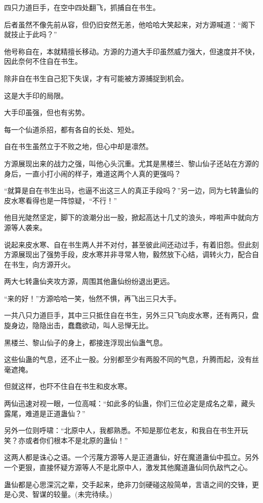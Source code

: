 \begin{this_body}
四只力道巨手，在空中四处翻飞，抓捕自在书生。

后者虽然不像先前从容，但仍旧安然无恙，他哈哈大笑起来，对方源喊道：“阁下就技止于此吗？”

他号称自在，本就精擅长移动。方源的力道大手印虽然威力强大，但速度并不快，因此奈何不住自在书生。

除非自在书生自己犯下失误，才有可能被方源捕捉到机会。

这是大手印的局限。

大手印虽强，但也有劣势。

每一个仙道杀招，都有各自的长处、短处。

自在书生虽然立于不败之地，但心中却是凛然。

方源展现出来的战力之强，叫他心头沉重。尤其是黑楼兰、黎山仙子还站在方源的身后，一直小打小闹的样子，难道这两个人真的更强吗？

“就算是自在书生出马，也逼不出这三人的真正手段吗？”另一边，同为七转蛊仙的皮水寒看得也是一阵惊疑，“不行！”

他目光陡然坚定，脚下的浪潮分出一股，掀起高达十几丈的浪头，哗啦声中就向方源等人袭来。

说起来皮水寒、自在书生两人并不对付，甚至彼此间还动过手，有着旧怨。但此刻方源展现出了强势手段，皮水寒并非寻常人物，毅然放下心结，调转火力，配合自在书生，向方源开火。

两大七转蛊仙夹攻方源，周围其他蛊仙纷纷退出更远。

“来的好！”方源哈哈一笑，怡然不惧，再飞出三只大手。

一共八只力道巨手，其中三只抵住自在书生，另外三只飞向皮水寒，还有两只，盘旋身边，隐隐出击，蠢蠢欲动，叫人忌惮无比。

黑楼兰、黎山仙子的身上，都接连浮现出仙蛊气息。

这些仙蛊的气息，还不止一股。分别都至少有两股不同的气息，升腾而起，没有丝毫遮掩。

但就这样，也吓不住自在书生和皮水寒。

两仙迅速对视一眼，一位高喊：“如此多的仙蛊，你们三位必定是成名之辈，藏头露尾，难道是正道蛊仙？”

另外一位则呼啸：“北原中人，我都熟悉。不知是那位老友，和我自在书生开玩笑？亦或者你们根本不是北原的蛊仙！”

这两人都是诛心之语。一个污蔑方源等人是正道蛊仙，好在魔道蛊仙中孤立。另外一个更狠，直接怀疑方源等人不是北原中人，激发其他魔道蛊仙同仇敌忾之心。

蛊仙都是心思深沉之辈，交手起来，绝非刀剑硬碰这般简单，言语之间的交锋，更是心灵、智谋的较量。(未完待续。)

\end{this_body}

